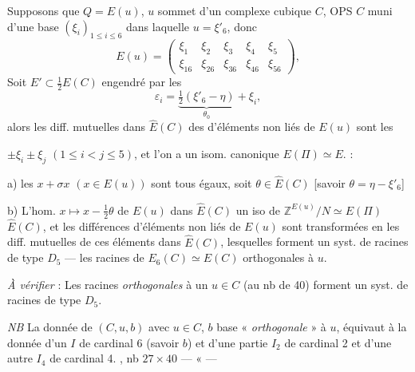\documentclass[11pt,a4paper]{article}
\begin{document}
Supposons que $Q = E(u)$, $u$ sommet d'un complexe cubique $C$, OPS $C$
muni d'une base $(\xi_i)_{1 \leq i \leq 6}$ dans laquelle $u = \xi'_6$, donc
\[
E(u) = \begin{pmatrix}
\xi_1 & \xi_2 & \xi_3 & \xi_4 & \xi_5 \\
\xi_{16} & \xi_{26} & \xi_{36} & \xi_{46} & \xi_{56}
\end{pmatrix},
\]
\struck{\ill{}} Soit $E' \subset \frac{1}{2} E(C)$ engendré par les
\[
\varepsilon_i = \underbrace{\tfrac{1}{2}(\xi'_6 - \eta)}_{\theta_0} + \xi_i ,
\]
alors les diff. mutuelles dans $\hat{E}(C)$ des 
d'éléments non liés de $E(u)$ sont les


$\pm \xi_i \pm \xi_j$ $(1 \leq i < j \leq 5)$, et l'on a un isom.
canonique $E(\Pi) \simeq E$.  :

a) les $x + \sigma x$ $(x \in E(u))$ sont tous égaux, soit
$\theta \in \hat{E}(C)$ [savoir $\theta = \eta - \xi'_6$]

b) L'hom. $x \mapsto x - \frac{1}{2}\theta$ de $E(u)$ dans $\hat{E}(C)$
\struck{\ill{}} un iso de $\mathbb{Z}^{E(u)}/N \simeq E(\Pi)$ \ill{}
$\hat{E}(C)$, et les différences \struck{\ill{}} 
  d'éléments non liés de $E(u)$ sont
transformées en les diff. mutuelles de ces éléments dans $\hat{E}(C)$,
lesquelles forment  un syst. de  racines de type
$D_5$ — \ill{}  les  racines de
$E_6(C) \simeq E(C)$ orthogonales à $u$.


\emph{À vérifier} : Les racines \emph{orthogonales} à un $u \in C$ (au nb
de 40) forment un syst. de racines de type $D_5$.

\emph{NB} La donnée de $(C, u, b)$ avec $u \in C$, $b$ base
« \emph{orthogonale} » à $u$, équivaut à la donnée d'un $I$ de cardinal 6
(savoir $b$) et d'une partie  $I_2$ de cardinal 2 et d'une
autre $I_4$ de cardinal 4. , 
nb $27 \times 40$ — « — 
\end{document}
